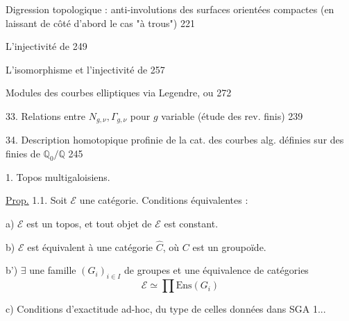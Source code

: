  Digression topologique : anti-involutions des surfaces
orientées compactes (en laissant de côté d'abord le cas "à trous")
\hfill 221

 L'injectivité de
\hfill 249

 L'isomorphisme
et l'injectivité de
\hfill 257

 Modules des courbes elliptiques via Legendre, ou
 \hfill 272

33. Relations entre \(N_{g,\nu},\Gamma_{g,\nu}\) pour \(g\)
variable (étude des rev. finis) \hfill 239

34. Description homotopique profinie de la cat. des courbes alg.
définies sur des 
 finies de \(\mathbb Q_0/\mathbb Q\)
\hfill 245




1. Topos multigaloisiens.

\uline{Prop.} 1.1. Soit \(\mathcal E\) une catégorie.
Conditions équivalentes :

a) \(\mathcal E\) est un topos, et tout objet de \(\mathcal E\)
est  constant.

b) \(\mathcal E\) est équivalent à une catégorie \(\widehat C\),
où \(C\) est un groupoïde.


b') \(\exists\) une famille \((G_i)_{i\in I}\) de groupes
et une équivalence de catégories
\[
\mathcal E\simeq\prod\mathrm{Ens}(G_i)
\]

c) Conditions d'exactitude ad-hoc, du type de celles données dans SGA 1...

